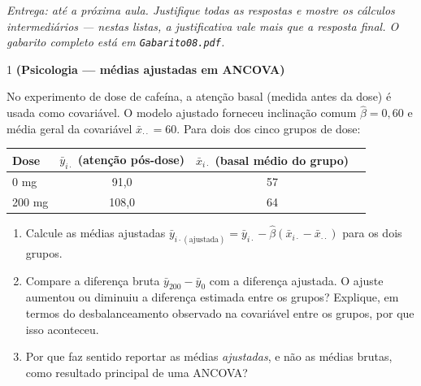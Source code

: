 \documentclass[11pt]{article}
\begin{document}

\noindent \textit{Entrega: até a próxima aula. Justifique todas as respostas e mostre os cálculos
intermediários --- nestas listas, a justificativa vale mais que a resposta final. O gabarito
completo está em \texttt{Gabarito08.pdf}.}

\begin{questao}{1} \textbf{(Psicologia --- médias ajustadas em ANCOVA)}

No experimento de dose de cafeína, a atenção basal (medida antes da dose) é usada como
covariável. O modelo ajustado forneceu inclinação comum $\hat\beta = 0{,}60$ e média geral da
covariável $\bar x_{\cdot\cdot} = 60$. Para dois dos cinco grupos de dose:

\begin{center}
\begin{tabular}{lccc}
\toprule
Dose & $\bar y_{i\cdot}$ (atenção pós-dose) & $\bar x_{i\cdot}$ (basal médio do grupo) \\
\midrule
0 mg   & 91{,}0 & 57 \\
200 mg & 108{,}0 & 64 \\
\bottomrule
\end{tabular}
\end{center}

\begin{enumerate}[label=(\alph*)]
  \item Calcule as médias ajustadas $\bar y_{i\cdot(\text{ajustada})} = \bar y_{i\cdot} -
    \hat\beta(\bar x_{i\cdot} - \bar x_{\cdot\cdot})$ para os dois grupos.
  \item Compare a diferença bruta $\bar y_{200} - \bar y_0$ com a diferença ajustada. O ajuste
    aumentou ou diminuiu a diferença estimada entre os grupos? Explique, em termos do
    desbalanceamento observado na covariável entre os grupos, por que isso aconteceu.
  \item Por que faz sentido reportar as médias \emph{ajustadas}, e não as médias brutas, como
    resultado principal de uma ANCOVA?
\end{enumerate}
\end{questao}
\end{document}
